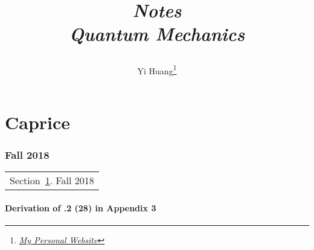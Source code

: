 \documentclass[10pt]{article}
\title{\begin{center}{\Huge \textit{Notes}}\\{{\itshape Quantum Mechanics}}\end{center}}
\author{Yi Huang\footnote{\href{https://yiihuang.com/}{\textit{My Personal Website}}}}
\affiliation{
University of Minnesota
}
\begin{document}
	\maketitle
	\flushbottom
	\newpage
	\pagestyle{fancynotes}
	\part{Caprice}
	\section{Fall 2018}\label{sec:fall2018}
	\begin{margintable}\vspace{.8in}\footnotesize
		\begin{tabularx}{\marginparwidth}{|X}
		Section~\ref{sec:fall2018}. Fall 2018\\
		\end{tabularx}
	\end{margintable}

	\subsection{Derivation of .2 (28) in Appendix 3}
\end{document}
